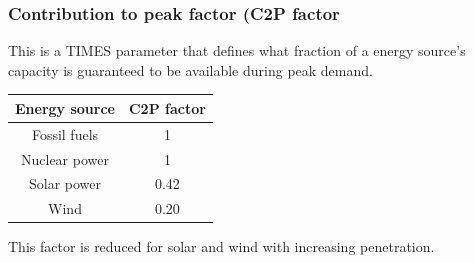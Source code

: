 \begin{frame}
\frametitle{Contribution to peak factor (C2P factor}
This is a TIMES parameter that defines what fraction of a energy source's capacity is guaranteed to be available during peak demand.
\begin{tabular}{|c|c|}
\textbf{Energy source} &
\textbf{C2P factor} \\
\hline 
Fossil fuels & 1 \\
Nuclear power & 1 \\
Solar power & 0.42 \\
Wind & 0.20 \\
\end{tabular}

This factor is reduced for solar and wind with increasing penetration.
\end{frame}
